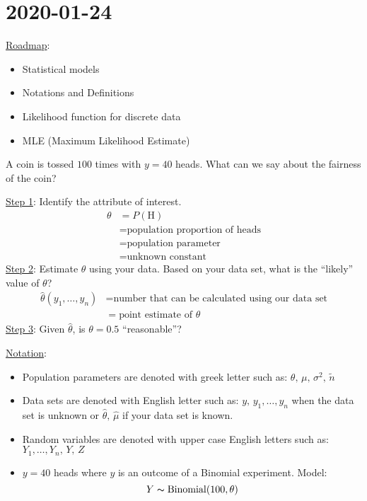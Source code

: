 \section{2020-01-24}
\underline{Roadmap}:
\begin{itemize}
    \item Statistical models
    \item Notations and Definitions
    \item Likelihood function for discrete data
    \item MLE (Maximum Likelihood Estimate)
\end{itemize}

A coin is tossed $ 100 $ times with $ y=40 $ heads. What can we say
about the fairness of the coin?

\underline{Step 1}: Identify the attribute of interest.
\begin{align*}
    \theta & =P(\text{H})                           \\
           & =\text{population proportion of heads} \\
           & =\text{population parameter}           \\
           & =\text{unknown constant}
\end{align*}
\underline{Step 2}: Estimate $ \theta $ using your data. Based on your data
set, what is the ``likely'' value of $ \theta $?
\begin{align*}
    \hat{\theta}(y_1,\ldots ,y_n) & =
    \text{number that can be calculated using our data set}           \\
                                  & =\text{point estimate of } \theta
\end{align*}
\underline{Step 3}: Given $ \hat{\theta} $, is $ \theta=0.5 $ ``reasonable''?

\underline{Notation}:
\begin{itemize}
    \item Population parameters are denoted with greek letter such as:
          $ \theta,\,\mu,\,\sigma^2,\,\tilde{n} $
    \item Data sets are denoted with English letter such as:
          $ y,\,y_1,\ldots ,y_n $ when the data set is unknown or
          $ \hat{\theta},\,\hat{\mu} $ if your data set is known.
    \item Random variables are denoted with upper case English letters such as:
          $ Y_1,\ldots ,Y_n,\,Y,\,Z $
    \item $ y=40 $ heads where $ y $ is an outcome of a Binomial experiment. Model:
          \[ Y \thicksim \operatorname{Binomial}(100,\theta) \]
\end{itemize}

